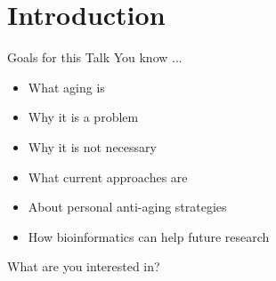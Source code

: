 \section{Introduction}




\begin{frame}[c]{Goals for this Talk}
    \large
    You know ...
    \begin{itemize}[<+(1)->]
        \item What aging is
        \item Why it is a problem
        \item Why it is not necessary
        \item What current approaches are
        \item About personal anti-aging strategies
        \item How bioinformatics can help future research
    \end{itemize}
\end{frame}


\addtocounter{framenumber}{1}
\begin{frame}[standout]
    What are you interested in?
\end{frame}
